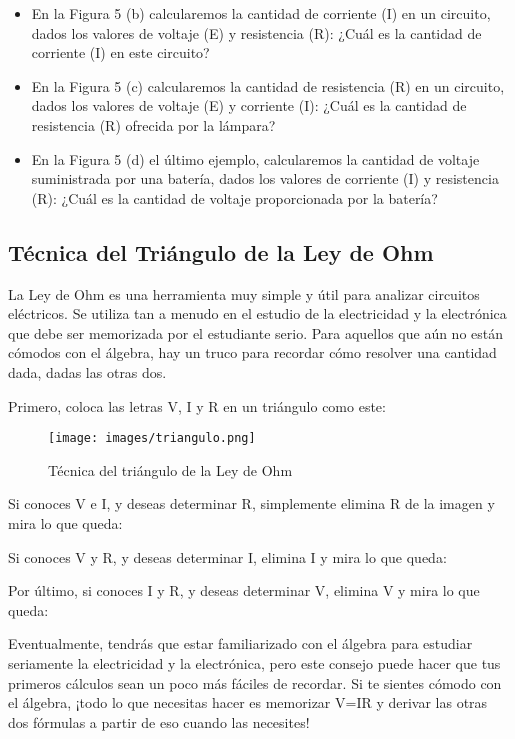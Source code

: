 \documentclass[output=paper, 
colorlinks,
citecolor=brown,
newtxmath
]{langscibook}
\begin{document}
\begin{itemize}
  \setlength\itemsep{-0.5em}
\item En la Figura 5 (b) calcularemos la cantidad de corriente (I) en un circuito, dados los valores de voltaje (E) y resistencia (R): ¿Cuál es la cantidad de corriente (I) en este circuito?
\item En la Figura 5 (c) calcularemos la cantidad de resistencia (R) en un circuito, dados los valores de voltaje (E) y corriente (I): ¿Cuál es la cantidad de resistencia (R) ofrecida por la lámpara?
\item En la Figura 5 (d) el último ejemplo, calcularemos la cantidad de voltaje suministrada por una batería, dados los valores de corriente (I) y resistencia (R): ¿Cuál es la cantidad de voltaje proporcionada por la batería?
\end{itemize}


\subsection{Técnica del Triángulo de la Ley de Ohm}

La Ley de Ohm es una herramienta muy simple y útil para analizar circuitos eléctricos. Se utiliza tan a menudo en el estudio de la electricidad y la electrónica que debe ser memorizada por el estudiante serio. Para aquellos que aún no están cómodos con el álgebra, hay un truco para recordar cómo resolver una cantidad dada, dadas las otras dos.

Primero, coloca las letras V, I y R en un triángulo como este:

\begin{figure}[H]
\texttt{[image: images/triangulo.png]}
\caption{Técnica del triángulo de la Ley de Ohm}
\label{fig:unidades}
\end{figure}



Si conoces V e I, y deseas determinar R, simplemente elimina R de la imagen y mira lo que queda:

Si conoces V y R, y deseas determinar I, elimina I y mira lo que queda:

Por último, si conoces I y R, y deseas determinar V, elimina V y mira lo que queda:

Eventualmente, tendrás que estar familiarizado con el álgebra para estudiar seriamente la electricidad y la electrónica, pero este consejo puede hacer que tus primeros cálculos sean un poco más fáciles de recordar. Si te sientes cómodo con el álgebra, ¡todo lo que necesitas hacer es memorizar V=IR y derivar las otras dos fórmulas a partir de eso cuando las necesites!
\end{document}
